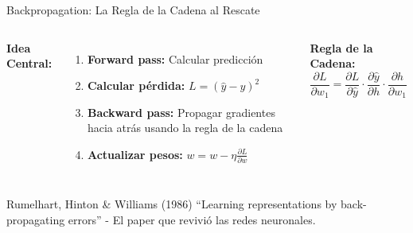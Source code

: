 \documentclass[aspectratio=169]{beamer}
\begin{document}
\begin{frame}{Backpropagation: La Regla de la Cadena al Rescate}
    \begin{columns}
        \textbf{Idea Central:}
        \begin{enumerate}
            \item \textbf{Forward pass:} Calcular predicción
            \item \textbf{Calcular pérdida:} $L = (\hat{y} - y)^2$
            \item \textbf{Backward pass:} Propagar gradientes hacia atrás usando la regla de la cadena
            \item \textbf{Actualizar pesos:} $w = w - \eta \frac{\partial L}{\partial w}$
        \end{enumerate}
        
        \textbf{Regla de la Cadena:}
        \[
        \frac{\partial L}{\partial w_1} = \frac{\partial L}{\partial \hat{y}} \cdot \frac{\partial \hat{y}}{\partial h} \cdot \frac{\partial h}{\partial w_1}
        \]
        
        \vspace{0.3cm}
        \centering
    \end{columns}
    
    \vspace{0.3cm}
    \begin{exampleblock}{Rumelhart, Hinton \& Williams (1986)}
        ``Learning representations by back-propagating errors'' - El paper que revivió las redes neuronales.
    \end{exampleblock}
\end{frame}
\end{document}
